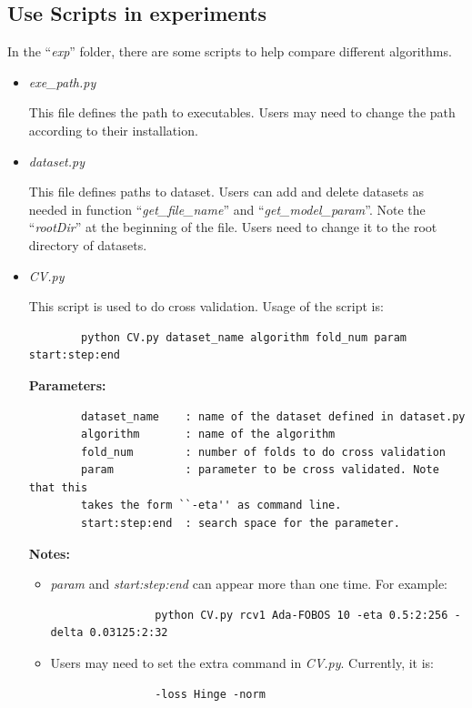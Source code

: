 \documentclass[11pt,a4paper]{article}
\newlength{\wideitemsep}
\let\olditem\item
\renewcommand{\item}{\setlength{\itemsep}{\wideitemsep}\olditem}
\begin{document}
\subsection{Use Scripts in experiments}
In the ``\emph{exp}'' folder, there are some scripts to help compare different
algorithms.
\begin{itemize}
    \item \emph{exe\_path.py}

        This file defines the path to executables. Users may need to change the
        path according to their installation.
    \item \emph{dataset.py}

        This file defines paths to dataset. Users can add and delete datasets
        as needed in function ``\emph{get\_file\_name}'' and
        ``\emph{get\_model\_param}''.  Note the ``\emph{rootDir}'' at the
        beginning of the file. Users need to change it to the root directory of
        datasets.

    \item \emph{CV.py}

        This  script is used to do cross validation. Usage of the script is:
        \lstset{language=python,
            framexleftmargin=-1cm,
            xleftmargin=-1cm,
        }
        \begin{lstlisting}
        python CV.py dataset_name algorithm fold_num param start:step:end
        \end{lstlisting}

        \textbf{Parameters:}
        \lstset{language=bash,
            framexleftmargin=-1cm,
            xleftmargin=-1cm,
        }

        \begin{lstlisting}
        dataset_name    : name of the dataset defined in dataset.py
        algorithm       : name of the algorithm
        fold_num        : number of folds to do cross validation
        param           : parameter to be cross validated. Note that this
        takes the form ``-eta'' as command line.
        start:step:end  : search space for the parameter.
        \end{lstlisting}

        \textbf{Notes:}
        \begin{itemize}
            \item \emph{param} and \emph{start:step:end} can appear more than
                one time. For example:
                \lstset{language=python,
                    framexleftmargin=-3cm,
                    xleftmargin=-3cm,
                }
                \begin{lstlisting}
                python CV.py rcv1 Ada-FOBOS 10 -eta 0.5:2:256 -delta 0.03125:2:32
                \end{lstlisting}
            \item Users may need to set the extra command in \emph{CV.py}.
                Currently, it is:
                \lstset{language=python}
                \begin{lstlisting}
                -loss Hinge -norm
                \end{lstlisting}


\end{itemize}
\end{itemize}
\end{document}
